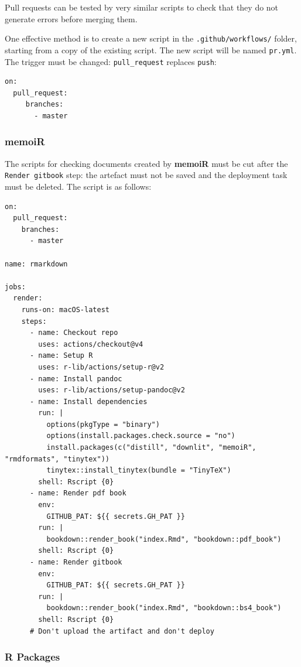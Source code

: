 \documentclass[
  12pt,
  american,
  a4paper,
  extrafontsizes,onecolumn,openright
  ]{memoir}
\begin{document}
Pull requests can be tested by very similar scripts to check that they do not generate errors before merging them.

One effective method is to create a new script in the \texttt{.github/workflows/} folder, starting from a copy of the existing script.
The new script will be named \texttt{pr.yml}.
The trigger must be changed: \texttt{pull\_request} replaces \texttt{push}:

\begin{verbatim}
on:
  pull_request:
     branches:
       - master
\end{verbatim}

\subsubsection{memoiR}\label{sec:memoiR-pr-ci}

The scripts for checking documents created by \textbf{memoiR} must be cut after the \texttt{Render\ gitbook} step: the artefact must not be saved and the deployment task must be deleted.
The script is as follows:

\begin{verbatim}
on:
  pull_request:
    branches:
      - master

name: rmarkdown

jobs:
  render:
    runs-on: macOS-latest
    steps:
      - name: Checkout repo
        uses: actions/checkout@v4
      - name: Setup R
        uses: r-lib/actions/setup-r@v2
      - name: Install pandoc
        uses: r-lib/actions/setup-pandoc@v2
      - name: Install dependencies
        run: |
          options(pkgType = "binary")
          options(install.packages.check.source = "no")
          install.packages(c("distill", "downlit", "memoiR", "rmdformats", "tinytex"))
          tinytex::install_tinytex(bundle = "TinyTeX")
        shell: Rscript {0}
      - name: Render pdf book
        env:
          GITHUB_PAT: ${{ secrets.GH_PAT }}
        run: |
          bookdown::render_book("index.Rmd", "bookdown::pdf_book")
        shell: Rscript {0}
      - name: Render gitbook
        env:
          GITHUB_PAT: ${{ secrets.GH_PAT }}
        run: |
          bookdown::render_book("index.Rmd", "bookdown::bs4_book")
        shell: Rscript {0}
      # Don't upload the artifact and don't deploy
\end{verbatim}

\subsubsection{R Packages}\label{sec:package-pr-ci6}
\end{document}
